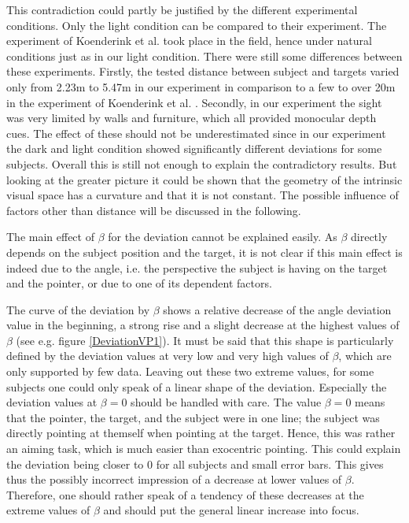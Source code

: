 This contradiction could partly be justified by the different experimental conditions. Only the light condition can be compared to their experiment. The experiment of Koenderink et al. \citeyear{Koenderink.2000} took place in the field, hence under natural conditions just as in our light condition. There were still some differences between these experiments. Firstly, the tested distance between subject and targets varied only from 2.23m to 5.47m in our experiment in comparison to a few to over 20m in the experiment of Koenderink et al. \citeyear{Koenderink.2000}. Secondly, in our experiment the sight was very limited by walls and furniture, which all provided monocular depth cues. The effect of these should not be underestimated since in our experiment the dark and light condition showed significantly different deviations for some subjects. Overall this is still not enough to explain the contradictory results. 
But looking at the greater picture %
it could be shown that the geometry of the intrinsic visual space has a curvature and that it is not constant. The possible influence of factors other than distance will be discussed in the following. 

The main effect of $\beta$ for the deviation cannot be explained easily. As $\beta$ directly depends on the subject position and the target, it is not clear if this main effect is indeed due to the angle, i.e. the perspective the subject is having on the target and the pointer, or due to one of its dependent factors. 

The curve of the deviation by $\beta$ shows a relative decrease of the angle deviation value in the beginning, a strong rise and a slight decrease at the highest values of $\beta$ (see e.g. figure \ref{DeviationVP1}). It must be said that this shape is particularly defined by the deviation values at very low and very high values of $\beta$, which are only supported by few data.
Leaving out these two extreme values, for some subjects one could only speak of a linear shape of the deviation. Especially the deviation values at $\beta = 0$ should be handled with care. The value $\beta = 0$ means that the pointer, the target, and the subject were in one line; the subject was directly pointing at themself when pointing at the target. Hence, this was rather an aiming task, which is much easier than exocentric pointing. This could explain the deviation being closer to $0$ for all subjects and small error bars. This gives thus the possibly incorrect impression of a decrease at lower values of $\beta$. Therefore, one should rather speak of a tendency of these decreases at the extreme values of $\beta$ and should put the general linear increase into focus.

